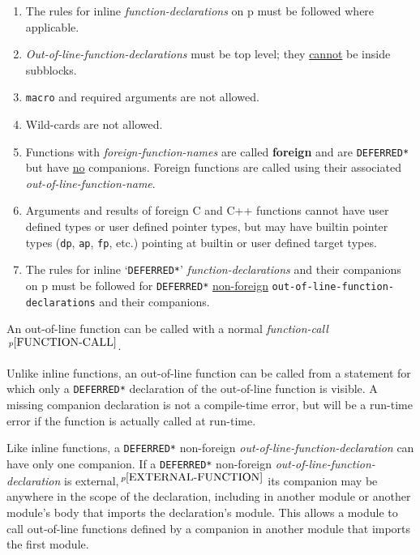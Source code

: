 \documentclass[12pt]{article}
\newcommand{\key}[1]{{\rm \bfseries #1}}
\newcommand{\pagref}[1]{p\pageref{#1}}
\newcommand{\pagnote}[1]{$\,^{p\pageref{#1}}$}
\newenvironment{indpar}[1][0.3in]%
	{\begin{list}{}%
		     {\setlength{\itemsep}{0in}%
		      \setlength{\topsep}{0in}%
		      \setlength{\parsep}{1ex}%
		      \setlength{\labelwidth}{#1}%
		      \setlength{\leftmargin}{#1}%
		      \addtolength{\leftmargin}{\labelsep}}%
	 \item}%
	{\end{list}}
\begin{document}
\begin{indpar}
\begin{enumerate}
\item
The rules for inline {\em function-declarations} on
\pagref{FUNCTION-DECLARATION} must be followed where applicable.
\item
{\em Out-of-line-function-declarations} must be top level; they
\underline{cannot} be inside subblocks.
\item
{\tt macro} and required arguments are not allowed.
\item
Wild-cards are not allowed.
\item Functions with {\em foreign-function-names} are called \key{foreign}
and are {\tt *DEFERRED*} but have \underline{no} companions.
Foreign functions are called using
their associated {\em out-of-line-function-name}.
\item
Arguments and results of foreign C and C++ functions cannot
have user defined types or user defined pointer types,
but may have builtin pointer types ({\tt dp}, {\tt ap}, {\tt fp}, etc.)
pointing at builtin or user defined target types.
\item
The rules for inline `{\tt *DEFERRED*}'
{\em function-declarations} and
their companions on \pagref{COMPANION-DECLARATION}
must be followed for
{\tt *DEFERRED*} \underline{non-foreign}
{\tt out-of-line-function-de\-clar\-ations}
and their companions.
\end{enumerate}
\end{indpar}

An out-of-line function can be called with a normal
{\em function-call}\pagnote{FUNCTION-CALL}.

Unlike inline functions, an out-of-line function can
be called from a statement for which only a {\tt *DEFERRED*} declaration
of the out-of-line function is visible.  A missing companion
declaration is not a compile-time error, but will be a
run-time error if the function is actually called at run-time.

Like inline functions, a {\tt *DEFERRED*}
non-foreign {\em out-of-line-function-declaration}
can have only one companion.
If\label{OUT-OF-LINE-EXTERNAL-COMPANION}
a {\tt *DEFERRED*} non-foreign {\em out-of-line-function-declaration}
is ex\-ternal,\pagnote{EXTERNAL-FUNCTION}
its companion may be anywhere in the scope of the declaration,
including in another module or another module's body that imports
the declaration's module.
This allows a module to call out-of-line functions defined by
a companion in another module that imports the first module.
\end{document}
